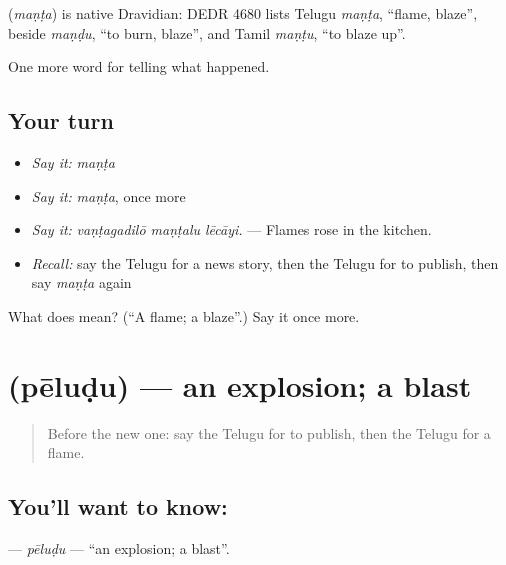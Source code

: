 \begin{cousinweb}
\textbf{} (\emph{maṇṭa}) is native Dravidian: DEDR 4680 lists Telugu \emph{maṇṭa}, \textquotedblleft{}flame, blaze\textquotedblright{}, beside \emph{maṇḍu}, \textquotedblleft{}to burn, blaze\textquotedblright{}, and Tamil \emph{maṇṭu}, \textquotedblleft{}to blaze up\textquotedblright{}.
\end{cousinweb}

\begin{grammarlens}[title={What you've built}]
One more word for telling what happened.
\end{grammarlens}

\subsection*{Your turn}
\begin{itemize}
\raggedright
  \item \emph{Say it:} \emph{maṇṭa}
  \item \emph{Say it:} \emph{maṇṭa}, once more
  \item \emph{Say it:} \emph{vaṇṭagadilō maṇṭalu lēcāyi.} — Flames rose in the kitchen.
  \item \emph{Recall:} say the Telugu for a news story, then the Telugu for to publish, then say \emph{maṇṭa} again
\end{itemize}

\begin{tcolorbox}[breakable,colback=teal!4,colframe=teal!35!black,title={Before you move on}]
What does  mean? (\textquotedblleft{}A flame; a blaze\textquotedblright{}.) Say it once more.
\end{tcolorbox}
\section[\texorpdfstring{\te{పేలుడు} (pēluḍu)}{పేలుడు (pēluḍu)}]{ (pēluḍu) — an explosion; a blast}

\label{lesson:TE-C331-peludu}



\begin{quote}
Before the new one: say the Telugu for to publish, then the Telugu for a flame.
\end{quote}

\subsection*{You'll want to know: }
\textbf{} — \emph{pēluḍu} — \textquotedblleft{}an explosion; a blast\textquotedblright{}.

